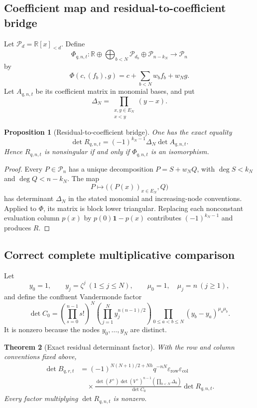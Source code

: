 \documentclass[11pt]{amsart}
\newcommand{\R}{\mathbb R}
\newcommand{\PP}{\mathcal P}
\newcommand{\Delt}{\mathit\Delta}
\newcommand{\1}{\mathbf 1}
\newtheorem{theorem}{Theorem}[section]
\newtheorem{proposition}[theorem]{Proposition}
\theoremstyle{remark}
\begin{document}
\subsection{Coefficient map and residual-to-coefficient bridge}
Let $\PP_d=\R[x]_{<d}$. Define
\begin{equation}\label{eq:Phi-main}
 \Phi_{q,n,t}:\R\oplus\bigoplus_{b<N}\PP_{d_b}\oplus\PP_{n-k_N}
 \longrightarrow\PP_n
\end{equation}
by
\[
 \Phi(c,(f_b),g)=c+\sum_{b<N}w_bf_b+w_Ng.
\]
Let $A_{q,n,t}$ be its coefficient matrix in monomial bases, and put
\[
 \Delt_N=\prod_{\substack{x,y\in E_N\\x<y}}(y-x).
\]

\begin{proposition}[Residual-to-coefficient bridge]\label{prop:R-A-main}
One has the exact equality
\begin{equation}\label{eq:R-A-main}
 \det R_{q,n,t}=(-1)^{k_N-1}\Delt_N\det A_{q,n,t}.
\end{equation}
Hence $R_{q,n,t}$ is nonsingular if and only if $\Phi_{q,n,t}$ is an isomorphism.
\end{proposition}

\begin{proof}
Every $P\in\PP_n$ has a unique decomposition $P=S+w_NQ$, with $\deg S<k_N$ and $\deg Q<n-k_N$. The map
\[
 P\longmapsto\bigl((P(x))_{x\in E_N},Q\bigr)
\]
has determinant $\Delt_N$ in the stated monomial and increasing-node conventions. Applied to $\Phi$, its matrix is block lower triangular. Replacing each nonconstant evaluation column $p(x)$ by $p(0)\1-p(x)$ contributes $(-1)^{k_N-1}$ and produces $R$.
\end{proof}

\subsection{Correct complete multiplicative comparison}
Let
\[
 y_0=1,\qquad y_j=\zeta^j\ (1\le j\le N),
 \qquad \mu_0=1,\quad \mu_j=n\ (j\ge1),
\]
and define the confluent Vandermonde factor
\begin{equation}\label{eq:C0-main}
 \det C_0=
 \left(\prod_{s=0}^{n-1}s!\right)^N
 \left(\prod_{j=1}^Ny_j^{n(n-1)/2}\right)
 \prod_{0\le a<b\le N}(y_b-y_a)^{\mu_a\mu_b}.
\end{equation}
It is nonzero because the nodes $y_0,\ldots,y_N$ are distinct.

\begin{theorem}[Exact residual determinant factor]\label{thm:complete-factor}
With the row and column conventions fixed above,
\begin{equation}\label{eq:complete-factor-main}
\begin{aligned}
 \det B_{q,r,t}
 &=(-1)^{N(N+1)/2+Nh}q^{-nN}
   \varepsilon_{\mathrm{row}}\varepsilon_{\mathrm{col}}\\
 &\quad\times
 \frac{\det(F^+)\det(V^+)^{n-1}
       \left(\prod_{b<N}\Delta_b\right)}{\det C_0}
 \det R_{q,n,t}.
\end{aligned}
\end{equation}
Every factor multiplying $\det R_{q,n,t}$ is nonzero.
\end{theorem}
\end{document}
